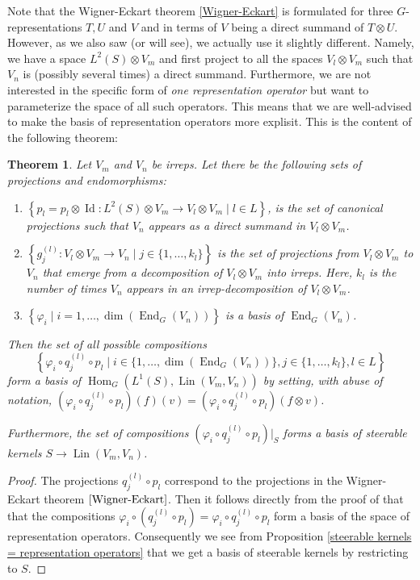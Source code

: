 \documentclass[12pt, a4paper]{article}
\theoremstyle{plain}
\newtheorem{thm}[pro]{Theorem}
\theoremstyle{definition}
\theoremstyle{remark}
\DeclareMathOperator{\lin}{Lin}
\DeclareMathOperator{\End}{End}
\DeclareMathOperator{\Hom}{Hom}
\DeclareMathOperator{\Id}{Id}
\begin{document}
Note that the Wigner-Eckart theorem \ref{Wigner-Eckart} is formulated for three $G$-representations $T, U$ and $V$ and in terms of $V$ being a direct summand of $T \otimes U$. However, as we also saw (or will see), we actually use it slightly different. Namely, we have a space $L^2(S) \otimes V_m$ and first project to all the spaces $V_l \otimes V_m$ such that $V_n$ is (possibly several times) a direct summand. Furthermore, we are not interested in the specific form of \emph{one representation operator} but want to parameterize the space of all such operators. This means that we are well-advised to make the basis of representation operators more explisit. This is the content of the following theorem:

\begin{thm}\label{representation operators basis}
Let $V_m$ and $V_n$ be irreps. Let there be the following sets of projections and endomorphisms:
\begin{enumerate}
\item $\left\lbrace p_l = p_l \otimes \Id: L^2(S) \otimes V_m \to V_l \otimes V_m \mid l \in L \right\rbrace$, is the set of canonical projections such that $V_n$ appears as a direct summand in $V_l \otimes V_m$.
\item $\left\lbrace g_j^{(l)}: V_l \otimes V_m \to V_n \mid j \in \{1, \dots, k_l\} \right\rbrace$ is the set of projections from $V_l \otimes V_m$ to $V_n$ that emerge from a decomposition of $V_l \otimes V_m$ into irreps. Here, $k_l$ is the number of times $V_n$ appears in an irrep-decomposition of $V_l \otimes V_m$.
\item $\left\lbrace \varphi_i \mid i = 1, \dots, \dim(\End_G(V_n)) \right\rbrace$ is a basis of $\End_G(V_n)$.
\end{enumerate}
Then the set of all possible compositions 
\begin{equation*}
\left\lbrace \varphi_i \circ q_j^{(l)} \circ p_l \mid i \in \{1, \dots, \dim(\End_G(V_n))\}, j \in \{1, \dots, k_l\}, l \in L \right\rbrace
\end{equation*} 
form a basis of $\Hom_G(L^1(S), \lin(V_m, V_n))$ by setting, with abuse of notation, $(\varphi_i \circ q_j^{(l)} \circ p_l)(f)(v) = (\varphi_i \circ q_j^{(l)} \circ p_l)(f \otimes v)$.

Furthermore, the set of compositions $(\varphi_i \circ q_j^{(l)} \circ p_l)|_{S}$ forms a basis of steerable kernels $S \to \lin(V_m, V_n)$.
\end{thm}

\begin{proof}
The projections $q_j^{(l)} \circ p_l$ correspond to the projections in the Wigner-Eckart theorem $\ref{Wigner-Eckart}$. Then it follows directly from the proof of that that the compositions $\varphi_i \circ (q_j^{(l)} \circ p_l) = \varphi_i \circ q_j^{(l)} \circ p_l$ form a basis of the space of representation operators. Consequently we see from Proposition \ref{steerable kernels = representation operators} that we get a basis of steerable kernels by restricting to $S$.
\end{proof}
\end{document}

